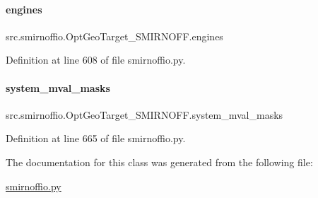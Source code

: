 \paragraph{\texorpdfstring{engines}{engines}}
{\footnotesize\ttfamily src.\+smirnoffio.\+Opt\+Geo\+Target\+\_\+\+S\+M\+I\+R\+N\+O\+F\+F.\+engines}



Definition at line 608 of file smirnoffio.\+py.

\mbox{\label{classsrc_1_1smirnoffio_1_1OptGeoTarget__SMIRNOFF_ad900ea245f0617dce6681e4fa54af0b5}} 
\paragraph{\texorpdfstring{system\+\_\+mval\+\_\+masks}{system\_mval\_masks}}
{\footnotesize\ttfamily src.\+smirnoffio.\+Opt\+Geo\+Target\+\_\+\+S\+M\+I\+R\+N\+O\+F\+F.\+system\+\_\+mval\+\_\+masks}



Definition at line 665 of file smirnoffio.\+py.



The documentation for this class was generated from the following file\+:\begin{DoxyCompactItemize}
\item 
\hyperlink{smirnoffio_8py}{smirnoffio.\+py}\end{DoxyCompactItemize}
